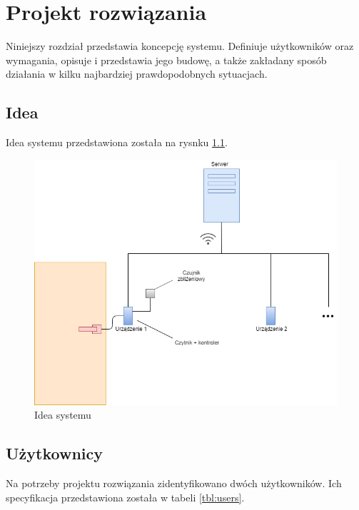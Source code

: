 \chapter{Projekt rozwiązania}
\label{chap:hl-arch}

    Niniejszy rozdział przedstawia koncepcję systemu. Definiuje użytkowników oraz wymagania, opisuje i przedstawia jego budowę, a także zakładany sposób działania w kilku najbardziej prawdopodobnych sytuacjach.

    \section{Idea}
        Idea systemu przedstawiona została na rysnku \ref{fig:door}.

        \begin{figure}[h]
            \begin{center}
                \includegraphics[width=.9\linewidth]{chapters/images/door2.png}
                \caption{Idea systemu}
                \label{fig:door}
            \end{center}
        \end{figure}

    \section{Użytkownicy}
        Na potrzeby projektu rozwiązania zidentyfikowano dwóch użytkowników. Ich specyfikacja przedstawiona została w tabeli \ref{tbl:users}.

